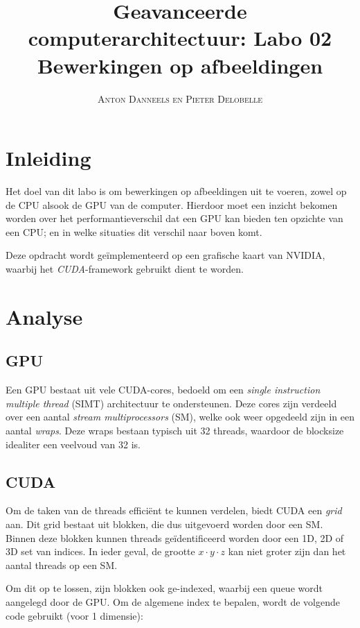 \documentclass[10pt, twocolumn, a4paper]{article}
\begin{document}
\title{Geavanceerde computerarchitectuur: Labo 02 \\ 
\large{Bewerkingen op afbeeldingen}}
\author{\textsc{Anton Danneels en Pieter Delobelle}}
\date{}
\maketitle

\section{Inleiding}
Het doel van dit labo is om bewerkingen op afbeeldingen uit te voeren, zowel op de CPU alsook de GPU van de computer. 
Hierdoor moet een inzicht bekomen worden over het performantieverschil dat een GPU kan bieden ten opzichte van een CPU; en in welke situaties dit verschil naar boven komt.

Deze opdracht wordt ge\"implementeerd op een grafische kaart van NVIDIA, waarbij het \emph{CUDA}-framework gebruikt dient te worden. 

\section{Analyse}

\subsection{GPU}
Een GPU bestaat uit vele CUDA-cores, bedoeld om een \emph{single instruction multiple thread} (SIMT) architectuur te ondersteunen. Deze cores zijn verdeeld over een aantal \emph{stream multiprocessors} (SM), welke ook weer opgedeeld zijn in een aantal \emph{wraps}. Deze wraps bestaan typisch uit 32 threads, waardoor de blocksize idealiter een veelvoud van 32 is.

\subsection{CUDA}
Om de taken van de threads effici\"ent te kunnen verdelen, biedt CUDA een \emph{grid} aan. Dit grid bestaat uit blokken, die dus uitgevoerd worden door een SM. Binnen deze blokken kunnen threads ge\"identificeerd worden door een 1D, 2D of 3D set van indices. In ieder geval, de grootte $x \cdot y \cdot z$ kan niet groter zijn dan het aantal threads op een SM.

Om dit op te lossen, zijn blokken ook ge-indexed, waarbij een queue wordt aangelegd door de GPU. Om de algemene index te bepalen, wordt de volgende code gebruikt (voor 1 dimensie): 
\end{document}
